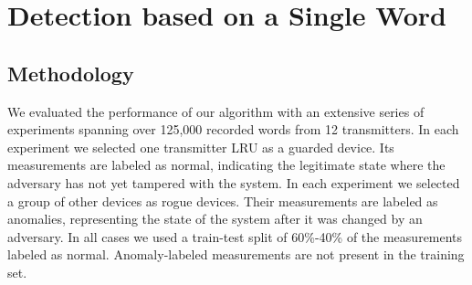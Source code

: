 \documentclass[english]{llncs}
\newcommand{\level}[1]{\section{#1}}
\newcommand{\sublevel}[1]{\subsection{#1}}
\newcommand{\level}[1]{\chapter{#1}}
\newcommand{\sublevel}[1]{\section{#1}}
\begin{document}
  \begin{table}
    \caption{Number of Features per Segment Type}
    \label{tab:feature_set_sizes}
    \centering
  \end{table}

\vspace*{-1ex}  
\level{Detection based on a Single Word} \label{PerformanceEvaluationSingleWord}
\vspace*{-1ex}
\sublevel{Methodology} \label{Methodology}
  We evaluated the performance of our algorithm with an extensive series of experiments spanning over 125,000 recorded words from 12 transmitters. In each experiment we selected one transmitter LRU as a guarded device. Its measurements are labeled as normal, indicating the legitimate state where the adversary has not yet tampered with the system. In each experiment we selected a group of other devices as rogue devices. Their measurements are labeled as anomalies, representing the state of the system after it was changed by an adversary. In all cases we used a train-test split of 60\%-40\% of the measurements labeled as normal. Anomaly-labeled measurements are not present in the training set.
  
\end{document}
